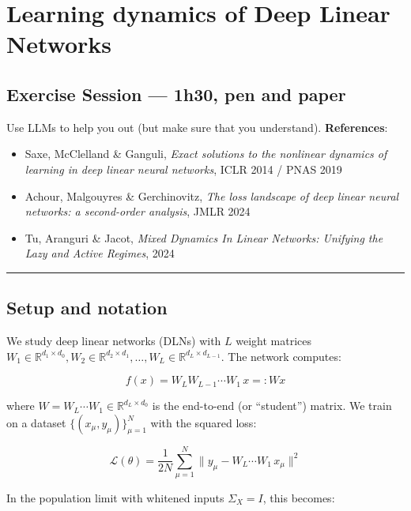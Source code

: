 \documentclass[
]{article}
\author{}
\date{}
\providecommand{\tightlist}{%
  \setlength{\itemsep}{0pt}\setlength{\parskip}{0pt}}
\begin{document}
\section{Learning dynamics of
Deep Linear Networks}\label{implicit-regularization-in-deep-linear-networks}

\subsection{Exercise Session --- 1h30, pen and
paper}\label{exercise-session-1h30-pen-and-paper}
Use LLMs to help you out (but make sure that you understand).
\textbf{References}:

\begin{itemize}
\tightlist
\item
  Saxe, McClelland \& Ganguli, \emph{Exact solutions to the nonlinear
  dynamics of learning in deep linear neural networks}, ICLR 2014 / PNAS
  2019
\item
  Achour, Malgouyres \& Gerchinovitz, \emph{The loss landscape of deep
  linear neural networks: a second-order analysis}, JMLR 2024
\item
  Tu, Aranguri \& Jacot, \emph{Mixed Dynamics In Linear Networks:
  Unifying the Lazy and Active Regimes}, 2024
\end{itemize}

\begin{center}\rule{0.5\linewidth}{0.5pt}\end{center}

\subsection{Setup and notation}\label{setup-and-notation}

We study deep linear networks (DLNs) with \(L\) weight matrices
\(W_1 \in \mathbb{R}^{d_1 \times d_0}, W_2 \in \mathbb{R}^{d_2 \times d_1}, \ldots, W_L \in \mathbb{R}^{d_L \times d_{L-1}}\).
The network computes:

\[f(x) = W_L W_{L-1} \cdots W_1 \, x =: W x\]

where \(W = W_L \cdots W_1 \in \mathbb{R}^{d_L \times d_0}\) is the
end-to-end (or ``student'') matrix. We train on a dataset
\(\{(x_\mu, y_\mu)\}_{\mu=1}^N\) with the squared loss:

\[\mathcal{L}(\theta) = \frac{1}{2N} \sum_{\mu=1}^{N} \|y_\mu - W_L \cdots W_1 \, x_\mu\|^2\]

In the population limit with whitened inputs \(\Sigma_X = I\), this
becomes:
\end{document}
